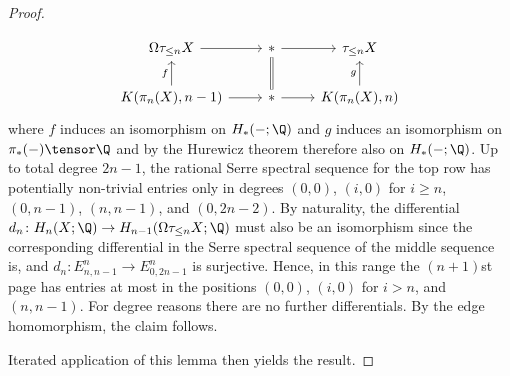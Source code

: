 \begin{proof}
\begin{smallproof}
\begin{equation*}
\begin{tikzcd}
				\Omega \tau_{\leq n} X
						\ar[r]
					& *
						\ar[r]
					& \tau_{\leq n} X
				\\
				K(\pi_n(X), n - 1)
						\ar[r]
						\ar[u, "f"]
					& *
						\ar[r]
						\ar[u, equal]
					& K(\pi_n(X), n)
						\ar[u, "g"]
			\end{tikzcd}
		\end{equation*}
		where $f$ induces an isomorphism on $H_*({{-}}; \Q)$ and $g$ induces an isomorphism on $\pi_*({{-}}) \tensor \Q$ and by the Hurewicz theorem therefore also on $H_*({{-}}; \Q)$.
		Up to total degree $2n - 1$, the rational Serre spectral sequence for the top row has potentially non-trivial entries only in degrees $(0, 0)$, $(i, 0)$ for $i \geq n$, $(0, n - 1)$, $(n, n - 1)$, and $(0, 2n - 2)$.
		By naturality, the differential $d_n\colon H_n(X; \Q) \to H_{n - 1}(\Omega \tau_{\leq n} X; \Q)$ must also be an isomorphism since the corresponding differential in the Serre spectral sequence of the middle sequence is, and $d_n\colon E^n_{n, n - 1} \to E^n_{0, 2n - 1}$ is surjective.
		Hence, in this range the $(n + 1)$st page has entries at most in the positions $(0, 0)$, $(i, 0)$ for $i > n$, and $(n, n - 1)$.
		For degree reasons there are no further differentials.
		By the edge homomorphism, the claim follows.
	\end{smallproof}
	Iterated application of this lemma then yields the result.
\end{proof}
